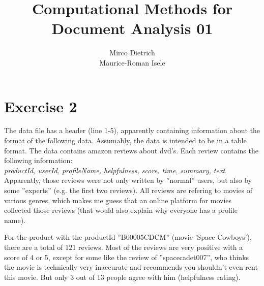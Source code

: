 \documentclass{article}
\title{Computational Methods for Document Analysis 01}
\author{Mirco Dietrich\\ Maurice-Roman Isele}
\begin{document}
\maketitle
\section*{Exercise 2}

The data file has a header (line 1-5), apparently containing information about the format of the following data. Assumably, the data is intended to be in a table format. The data contains amazon reviews about dvd's. Each review contains the following information: \\

\textit{productId, userId, profileName, helpfulness, score, time, summary, text} \\

\noindent Apparently, those reviews were not only written by ''normal'' users, but also by some ''experts'' (e.g. the first two reviews). All reviews are refering to movies of various genres, which makes me guess that an online platform for movies collected those reviews (that would also explain why everyone has a profile name).

For the product with the productId ''B00005CDCM'' (movie 'Space Cowboys'), there are a total of 121 reviews. Most of the reviews are very positive with a score of 4 or 5, except for some like the review of ''spacecadet007'', who thinks the movie is technically very inaccurate and recommends you shouldn't even rent this movie. But only 3 out of 13 people agree with him (helpfulness rating).
\end{document}
